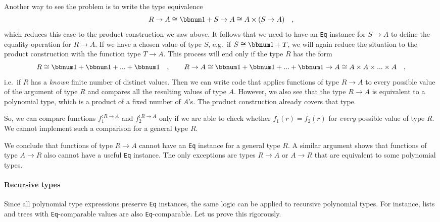 Another way to see the problem is to write the type equivalence
\[
R\rightarrow A\cong\bbnum 1+S\rightarrow A\cong A\times(S\rightarrow A)\quad,
\]
which reduces this case to the product construction we saw above.
It follows that we need to have an \lstinline!Eq! instance for $S\rightarrow A$
to define the equality operation for $R\rightarrow A$. If we have
a chosen value of type $S$, e.g.~if $S\cong\bbnum 1+T$, we will
again reduce the situation to the product construction with the function
type $T\rightarrow A$. This process will end only if the type $R$
has the form 
\[
R\cong\bbnum 1+\bbnum 1+...+\bbnum 1\quad,\quad\quad R\rightarrow A\cong\bbnum 1+\bbnum 1+...+\bbnum 1\rightarrow A\cong A\times A\times...\times A\quad,
\]
i.e.~if $R$ has a \emph{known} finite number of distinct values.
Then we can write code that applies functions of type $R\rightarrow A$
to every possible value of the argument of type $R$ and compares
all the resulting values of type $A$. However, we also see that the
type $R\rightarrow A$ is equivalent to a polynomial type, which is
a product of a fixed number of $A$'s. The product construction already
covers that type.

So, we can compare functions $f_{1}^{:R\rightarrow A}$ and $f_{2}^{:R\rightarrow A}$
only if we are able to check whether $f_{1}(r)=f_{2}(r)$ for \emph{every}
possible value of type $R$. We cannot implement such a comparison
for a general type $R$.

We conclude that functions of type $R\rightarrow A$ cannot have an
\lstinline!Eq! instance for a general type $R$. A similar argument
shows that functions of type $A\rightarrow R$ also cannot have a
useful \lstinline!Eq! instance. The only exceptions are types $R\rightarrow A$
or $A\rightarrow R$ that are equivalent to some polynomial types.

\paragraph{Recursive types}

Since all polynomial type expressions preserve \lstinline!Eq! instances,
the same logic can be applied to recursive polynomial types. For instance,
lists and trees with \lstinline!Eq!-comparable values are also \lstinline!Eq!-comparable.
Let us prove this rigorously.

